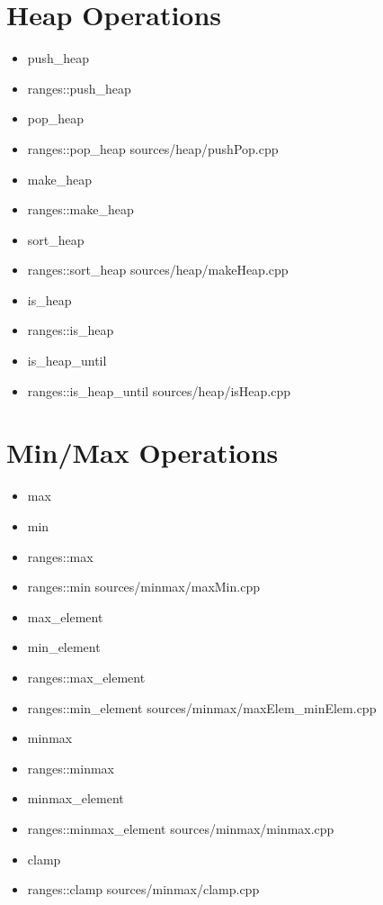 \documentclass{article}
\begin{document}
\section{Heap Operations}
    \begin{itemize}
      \item push\_heap
      \item ranges::push\_heap
      \item pop\_heap
      \item ranges::pop\_heap
         {sources/heap/pushPop.cpp}
      \item make\_heap
      \item ranges::make\_heap
      \item sort\_heap
      \item ranges::sort\_heap
         {sources/heap/makeHeap.cpp}
      \item is\_heap
      \item ranges::is\_heap
      \item is\_heap\_until
      \item ranges::is\_heap\_until
         {sources/heap/isHeap.cpp}
    \end{itemize}
\section{Min/Max Operations}
    \begin{itemize}
      \item max
      \item min
      \item ranges::max
      \item ranges::min
         {sources/minmax/maxMin.cpp}
      \item max\_element
      \item min\_element
      \item ranges::max\_element
      \item ranges::min\_element
         {sources/minmax/maxElem_minElem.cpp}
      \item minmax
      \item ranges::minmax
      \item minmax\_element
      \item ranges::minmax\_element
         {sources/minmax/minmax.cpp}
      \item clamp
      \item ranges::clamp
         {sources/minmax/clamp.cpp}
    \end{itemize}
\end{document}
